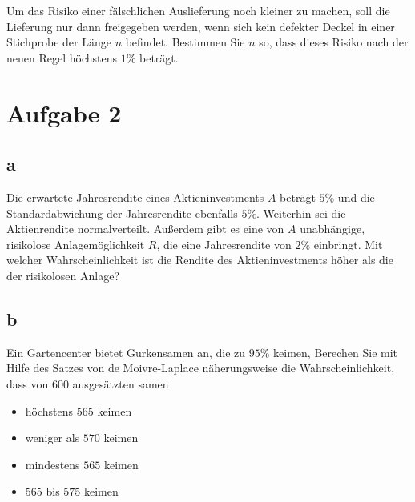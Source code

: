Um das Risiko einer fälschlichen Auslieferung noch kleiner zu machen, soll die Lieferung nur dann freigegeben werden, wenn sich kein defekter Deckel in einer Stichprobe der Länge $n$ befindet. Bestimmen Sie $n$ so, dass dieses Risiko nach der neuen Regel höchstens $1\%$ beträgt.

\section{Aufgabe 2}

\subsection{a}

Die erwartete Jahresrendite eines Aktieninvestments $A$ beträgt $5\%$ und die Standardabwichung der Jahresrendite ebenfalls $5\%$. Weiterhin sei die Aktienrendite normalverteilt. Außerdem gibt es eine von $A$ unabhängige, risikolose Anlagemöglichkeit $R$, die eine Jahresrendite von $2\%$ einbringt. Mit welcher Wahrscheinlichkeit ist die Rendite des Aktieninvestments höher als die der risikolosen Anlage?

\subsection{b}

Ein Gartencenter bietet Gurkensamen an, die zu $95\%$ keimen, Berechen Sie mit Hilfe des Satzes von de Moivre-Laplace näherungsweise die Wahrscheinlichkeit, dass von 600 ausgesätzten samen

\begin{itemize}
    \item höchstens $565$ keimen
    \item weniger als $570$ keimen
    \item mindestens $565$ keimen
    \item $565$ bis $575$ keimen
\end{itemize}